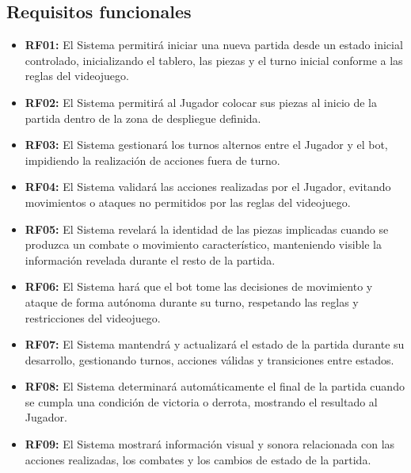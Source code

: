 \subsection{Requisitos funcionales}

\begin{itemize}
	
	\item \textbf{RF01:} El Sistema permitirá iniciar una nueva partida desde un estado inicial controlado, inicializando el tablero, las piezas y el turno inicial conforme a las reglas del videojuego.
	
	\item \textbf{RF02:} El Sistema permitirá al Jugador colocar sus piezas al inicio de la partida dentro de la zona de despliegue definida.
	
	\item \textbf{RF03:} El Sistema gestionará los turnos alternos entre el Jugador y el bot, impidiendo la realización de acciones fuera de turno.
	
	\item \textbf{RF04:} El Sistema validará las acciones realizadas por el Jugador, evitando movimientos o ataques no permitidos por las	reglas del videojuego.
	
	\item \textbf{RF05:} El Sistema revelará la identidad de las piezas implicadas cuando se produzca un combate o movimiento característico, manteniendo visible la información revelada durante el resto de la partida.
	
	\item \textbf{RF06:} El Sistema hará que el bot tome las decisiones de movimiento y ataque de forma autónoma durante su turno, respetando las reglas y restricciones del videojuego.
	
	\item \textbf{RF07:} El Sistema mantendrá y actualizará el estado de la partida durante su desarrollo, gestionando turnos, acciones válidas y transiciones entre estados.
	
	\item \textbf{RF08:} El Sistema determinará automáticamente el final de la partida cuando se cumpla una condición de victoria o derrota, mostrando el resultado al Jugador.
	
	\item \textbf{RF09:} El Sistema mostrará información visual y sonora relacionada con las acciones realizadas, los combates y los cambios de estado de la partida.
	

\end{itemize}
